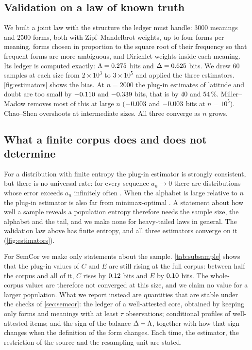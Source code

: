 \subsection{Validation on a law of known truth}
We built a joint law with the structure the ledger must handle: $3000$ meanings and $2500$ forms, both with Zipf--Mandelbrot weights, up to four forms per meaning, forms chosen in proportion to the square root of their frequency so that frequent forms are more ambiguous, and Dirichlet weights inside each meaning. Its ledger is computed exactly: $\Lambda=0.275$ bits and $\Delta=0.625$ bits. We drew $60$ samples at each size from $2\times10^3$ to $3\times10^5$ and applied the three estimators.
\cref{fig:estimators} shows the bias. At $n=2000$ the plug-in estimates of latitude and doubt are too small by $-0.110$ and $-0.339$ bits, that is by $40$ and $54\,\%$. Miller--Madow removes most of this at large $n$ ($-0.003$ and $-0.003$ bits at $n=10^5$). Chao--Shen overshoots at intermediate sizes. All three converge as $n$ grows.


\subsection{What a finite corpus does and does not determine}
For a distribution with finite entropy the plug-in estimator is strongly consistent, but there is no universal rate: for every sequence $a_n\to0$ there are distributions whose error exceeds $a_n$ infinitely often \citep{antos2001,silva2018}. When the alphabet is large relative to $n$ the plug-in estimator is also far from minimax-optimal \citep{paninski2003,wu2016}. A statement about how well a sample reveals a population entropy therefore needs the sample size, the alphabet and the tail, and we make none for heavy-tailed laws in general. The validation law above has finite entropy, and all three estimators converge on it (\cref{fig:estimators}).

For SemCor we make only statements about the sample. \cref{tab:subsample} shows that the plug-in values of $C$ and $E$ are still rising at the full corpus: between half the corpus and all of it, $C$ rises by $0.12$ bits and $E$ by $0.10$ bits. The whole-corpus values are therefore not converged at this size, and we claim no value for a larger population. What we report instead are quantities that are stable under the checks of \cref{sec:semcor}: the ledger of a well-attested core, obtained by keeping only forms and meanings with at least $\tau$ observations; conditional profiles of well-attested items; and the sign of the balance $\Delta-\Lambda$, together with how that sign changes when the definition of the form changes. Each time, the estimator, the restriction of the source and the resampling unit are stated.
\begin{table}[tbp]
\caption{The plug-in ledger of SemCor as the sample grows (mean of $12$ random subsamples; the last row is the whole corpus). Bits. The values of $C$ and $E$ are still rising at the full corpus.}\label{tab:subsample}
\centering\small

\end{table}
